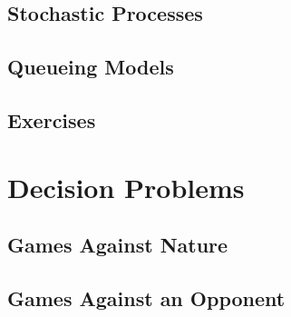 \documentclass[12pt]{book}
\begin{document}
\section{Stochastic Processes}

\section{Queueing Models}

\section{Exercises}

\chapter{Decision Problems}

\section{Games Against Nature}

\section{Games Against an Opponent}
\end{document}
